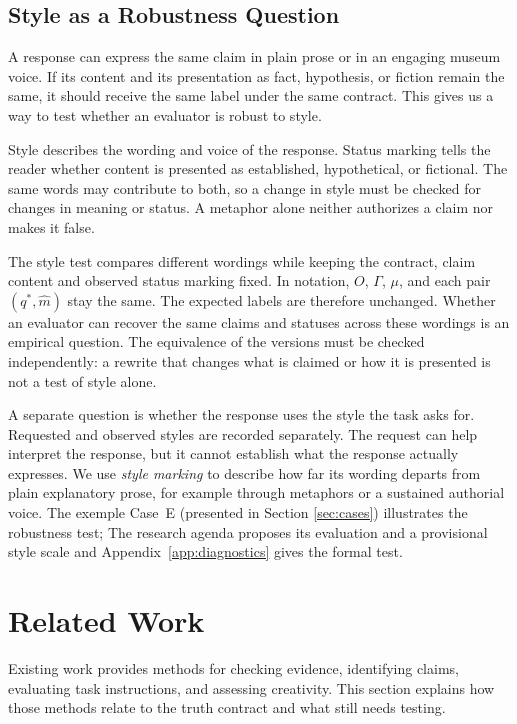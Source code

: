 \documentclass{clv2025}
\begin{document}
\subsection{Style as a Robustness Question}\label{subsec:style}

A response can express the same claim in plain prose or in an engaging
museum voice. If its content and its presentation as fact, hypothesis, or
fiction remain the same, it should receive the same label under the same
contract. This gives us a way to test whether an evaluator is robust to style.

Style describes the wording and voice of the response. Status marking tells
the reader whether content is presented as established, hypothetical, or
fictional. The same words may contribute to both, so a change in style must
be checked for changes in meaning or status. A metaphor alone neither
authorizes a claim nor makes it false.

The style test compares different wordings while keeping the contract, claim
content and observed status marking fixed. In notation, $O$, $\Gamma$,
$\mu$, and each pair $(q^*,\widehat{m})$ stay the same. The expected labels
are therefore unchanged. Whether an evaluator can recover the same claims
and statuses across these wordings is an empirical question. The equivalence
of the versions must be checked independently: a rewrite that changes what
is claimed or how it is presented is not a test of style alone.

A separate question is whether the response uses the style the task asks
for. Requested and observed styles are recorded separately. The request can
help interpret the response, but it cannot establish what the response
actually expresses. We use \emph{style marking} to describe how far its
wording departs from plain explanatory prose, for example through metaphors
or a sustained authorial voice. The exemple Case~E (presented in Section \ref{sec:cases}) illustrates the robustness test;
The research agenda proposes its evaluation and a provisional style scale and
Appendix~\ref{app:diagnostics} gives the formal test.



\section{Related Work}\label{sec:related}

Existing work provides methods for checking evidence, identifying claims,
evaluating task instructions, and assessing creativity. This section explains
how those methods relate to the truth contract and what still needs testing.
\end{document}
